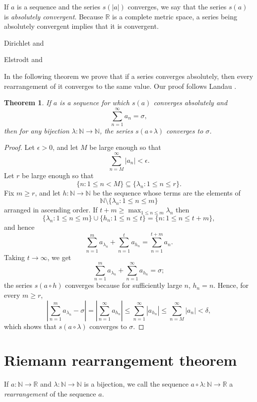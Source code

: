 \documentclass{article}
\newtheorem{theorem}{Theorem}
\begin{document}
If $a$ is a sequence and the series $s(|a|)$ converges, we say that the series $s(a)$ is {\em absolutely convergent}.
Because $\mathbb{R}$ is a complete metric space, a series being absolutely convergent implies that it is convergent.

Dirichlet \cite{dirichlet} and \cite[p.~176, \S 101]{dedekind}


Elstrodt \cite{elstrodt} and \cite{MR1613384}

In the following theorem we prove that if a series converges absolutely, then every rearrangement of it converges to the same
value. Our proof follows Landau \cite[p.~157, Theorem 216]{landau}.

\begin{theorem}
If $a$ is a sequence for which $s(a)$ converges absolutely and 
\[
\sum_{n=1}^\infty a_n = \sigma,
\]
then for any bijection $\lambda:\mathbb{N} \to \mathbb{N}$, the series $s(a \circ \lambda)$ converges to
$\sigma$.
\end{theorem}
\begin{proof}
Let $\epsilon>0$, and let $M$ be large enough so that
\[
\sum_{n=M}^\infty |a_n|<\epsilon.
\]
Let $r$ be large enough so that
\[
\{n: 1 \leq n <M\} \subseteq \{\lambda_n: 1 \leq n \leq r\}.
\]
Fix $m \geq r$, and
let $h:\mathbb{N} \to \mathbb{N}$ be the sequence whose terms are the elements of
\[
\mathbb{N} \setminus \{\lambda_n: 1 \leq n \leq m\}
\]
arranged in ascending order. If $t+m \geq \max_{1 \leq n \leq m} \lambda_n$ then 
\[
\{\lambda_n: 1 \leq n \leq m\} \cup \{h_n: 1 \leq n \leq t\} = \{n: 1 \leq n \leq t+m\},
\]
and hence
\[
\sum_{n=1}^m a_{\lambda_n} + \sum_{n=1}^t a_{h_n} = \sum_{n=1}^{t+m} a_n.
\]
Taking $t \to \infty$, we get
\[
\sum_{n=1}^m a_{\lambda_n} + \sum_{n=1}^\infty a_{h_n} = \sigma;
\]
the series $s(a \circ h)$ converges because for sufficiently large $n$, $h_n=n$.
Hence, for every $m \geq r$,
\[
\left| \sum_{n=1}^m a_{\lambda_n} - \sigma \right| = \left| \sum_{n=1}^\infty a_{h_n} \right|
\leq \sum_{n=1}^\infty |a_{h_n}| \leq \sum_{n=M}^\infty |a_n| < \delta,
\]
which shows that $s(a \circ \lambda)$ converges to $\sigma$.
\end{proof}


\section{Riemann rearrangement theorem}
If $a:\mathbb{N} \to \mathbb{R}$ and $\lambda:\mathbb{N} \to \mathbb{N}$ is a bijection,
we call the sequence $a \circ \lambda:\mathbb{N} \to \mathbb{R}$ a {\em rearrangement} of the sequence $a$.
\end{document}
